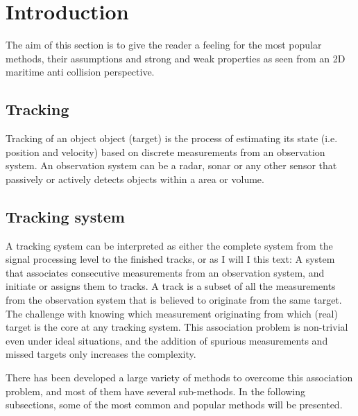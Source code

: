 \section{Introduction}
The aim of this section is to give the reader a feeling for the most popular methods, their assumptions and strong and weak properties as seen from an 2D maritime anti collision perspective.

\subsection{Tracking}
Tracking of an object object (target) is the process of estimating its state (i.e. position and velocity) based on discrete measurements from an observation system. An observation system can be a radar, sonar or any other sensor that passively or actively detects objects within a area or volume. 

\subsection{Tracking system}
A tracking system can be interpreted as either the complete system from the signal processing level to the finished tracks, or as I will I this text: A system that associates consecutive measurements from an observation system, and initiate or assigns them to tracks. A track is a subset of all the measurements from the observation system that is believed to originate from the same target. The challenge with knowing which measurement originating from which (real) target is the core at any tracking system. This association problem is non-trivial even under ideal situations, and the addition of spurious measurements and missed targets only increases the complexity.

There has been developed a large variety of methods to overcome this association problem, and most of them have several sub-methods. In the following subsections, some of the most common and popular methods will be presented.

